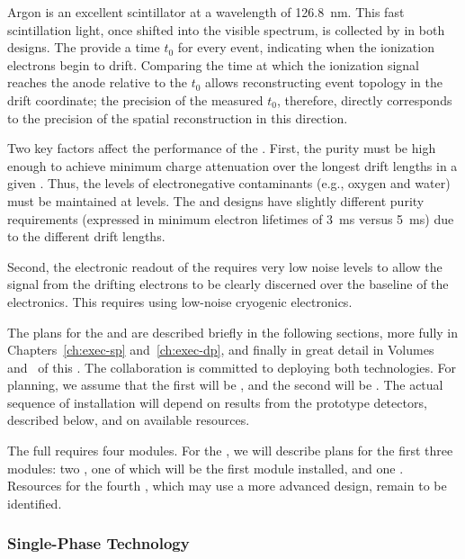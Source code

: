 Argon is an excellent scintillator at a wavelength of \SI{126.8}{\nano\meter}. This fast scintillation light, once shifted into the visible spectrum, is collected by  in both designs. The  provide a time $t_{0}$ for every event, indicating when the ionization electrons begin to drift. Comparing the time at which the ionization signal reaches the anode relative to the $t_{0}$ allows reconstructing event topology in the drift coordinate; the precision of the measured $t_{0}$, therefore, directly corresponds to the precision of the spatial reconstruction in this direction. 

Two key factors affect the performance of the  .  First, the  purity must be high enough to achieve minimum charge attenuation over the longest drift lengths in a given .  Thus, the levels of electronegative contaminants (e.g., oxygen and water) must be maintained at  levels.  The  and  designs have slightly different purity requirements (expressed in minimum electron lifetimes of \SI{3}{ms} versus \SI{5}{ms}) due to the different drift lengths.

Second, the electronic readout of the  requires very low noise levels to allow the signal from the drifting electrons to be clearly discerned over the baseline of the electronics.  This requires using low-noise cryogenic electronics. 

The plans for the  and   are described briefly in the following sections, more fully in Chapters~\ref{ch:exec-sp} and~\ref{ch:exec-dp}, and finally in great detail in Volumes~\volnumbersp{} and~\volnumberdp{} of this . 
The  collaboration is committed to deploying both technologies. 
For planning, we assume that the first  will be
, and the second will be .
The actual sequence of  installation will depend on results from the prototype detectors, described below, and on available resources.

The full   requires four modules. For the , we will describe plans for the first three modules: two , one of which will be the first module installed, and one . Resources for the fourth , which may use a more advanced design, remain to be identified. 

\subsubsection{Single-Phase Technology}
\label{sec:fdsp-exec-splar}

